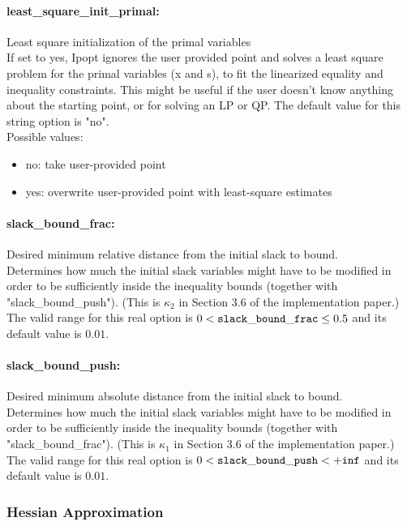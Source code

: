 \paragraph{least\_square\_init\_primal:}\label{sec:least_square_init_primal} Least square initialization of the primal variables $\;$ \\
 If set to yes, Ipopt ignores the user provided
point and solves a least square problem for the
primal variables (x and s), to fit the linearized
equality and inequality constraints.  This might
be useful if the user doesn't know anything about
the starting point, or for solving an LP or QP.
The default value for this string option is "no".
\\ 
Possible values:
\begin{itemize}
   \item no: take user-provided point
   \item yes: overwrite user-provided point with least-square
estimates
\end{itemize}

\paragraph{slack\_bound\_frac:}\label{sec:slack_bound_frac} Desired minimum relative distance from the initial slack to bound. $\;$ \\
 Determines how much the initial slack variables
might have to be modified in order to be
sufficiently inside the inequality bounds
(together with "slack\_bound\_push").  (This is
$\kappa_2$ in Section 3.6 of the implementation paper.) The valid range for this real option is 
$0 <  {\tt slack\_bound\_frac } \le 0.5$
and its default value is $0.01$.


\paragraph{slack\_bound\_push:}\label{sec:slack_bound_push} Desired minimum absolute distance from the initial slack to bound. $\;$ \\
 Determines how much the initial slack variables
might have to be modified in order to be
sufficiently inside the inequality bounds
(together with "slack\_bound\_frac").  (This is
$\kappa_1$ in Section 3.6 of the implementation paper.) The valid range for this real option is 
$0 <  {\tt slack\_bound\_push } <  {\tt +inf}$
and its default value is $0.01$.


\subsubsection{Hessian Approximation}
\label{sec:Hessian_Approximation}

